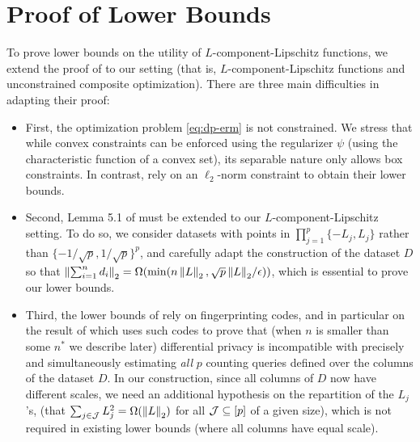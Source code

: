 
\section{Proof of Lower Bounds}
\label{sec:utility-lower-bounds-1}

To prove lower bounds on the utility of $L$-component-Lipschitz functions, we
extend the proof of \citet{bassily2014Private} to our setting
(that is, $L$-component-Lipschitz functions and unconstrained
composite optimization).
There are three main difficulties in adapting their proof:
\begin{itemize}
  \item First, the optimization problem \eqref{eq:dp-erm} is not constrained.
        We stress that while convex constraints can be enforced using the
        regularizer $\psi$ (using the characteristic function of a convex set),
        its separable nature only allows box constraints. In contrast,
        \citet{bassily2014Private} rely on an $\ell_2$-norm constraint to obtain
        their lower bounds.
  \item Second, Lemma 5.1 of \citet{bassily2014Private} must be extended to
        our $L$-component-Lipschitz setting.
        To do so, we consider datasets with points in $\prod_{j=1}^p \{-L_j, L_j\}$
        rather than $\{-1/\sqrt{p}, 1/\sqrt{p}\}^p$, and carefully adapt the
        construction of
        the dataset $D$ so that $\left \lVert \sum_{i=1}^n d_i \right \rVert_2 = \Omega(\min(n\left \lVert L \right \rVert_2, {\sqrt{p} \left \lVert L \right \rVert_2}/{\epsilon}))$,
        which is essential to prove our lower bounds.
  \item Third, the lower bounds of \citet{bassily2014Private} rely on fingerprinting
        codes, and in particular on the result of \citet{bun2014Fingerprinting} which
        uses such codes to prove that (when $n$ is smaller than
        some $n^*$ we describe later) differential privacy is incompatible with
        precisely and simultaneously estimating \emph{all} $p$ counting
        queries defined over the columns of the dataset $D$.
        In our construction, since all columns of $D$ now have different scales, we
        need an additional
        hypothesis on the repartition of the $L_j$'s, (\ie that
        $\sum_{j\in\mathcal J} L_j^2 = \Omega(\left \lVert L \right \rVert_2)$ for all $\mathcal J \subseteq [p]$ of a
        given size), which is not
        required in existing lower bounds (where all columns have equal scale).
\end{itemize}






